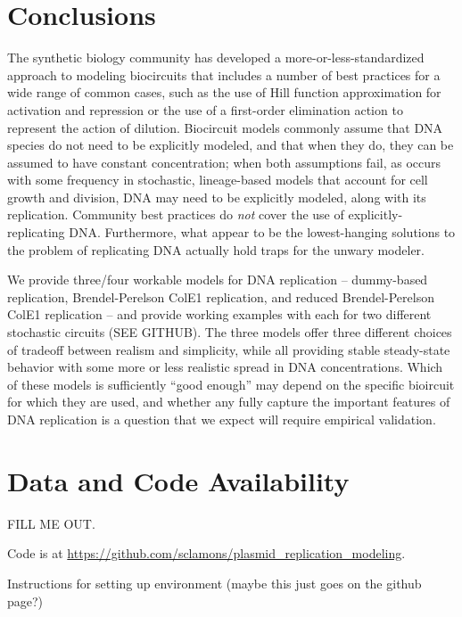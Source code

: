 \documentclass[preprint,12pt]{elsarticle}
\begin{document}
\section{Conclusions} \label{S:conclusions}

The synthetic biology community has developed a more-or-less-standardized approach to modeling biocircuits that includes a number of best practices for a wide range of common cases, such as the use of Hill function approximation for activation and repression or the use of a first-order elimination action to represent the action of dilution. Biocircuit models commonly assume that DNA species do not need to be explicitly modeled, and that when they do, they can be assumed to have constant concentration; when both assumptions fail, as occurs with some frequency in stochastic, lineage-based models that account for cell growth and division, DNA may need to be explicitly modeled, along with its replication. Community best practices do \emph{not} cover the use of explicitly-replicating DNA. Furthermore, what appear to be the lowest-hanging solutions to the problem of replicating DNA actually hold traps for the unwary modeler.

We provide three/four workable models for DNA replication -- dummy-based replication, Brendel-Perelson ColE1 replication, and reduced Brendel-Perelson ColE1 replication -- and provide working examples with each for two different stochastic circuits (SEE GITHUB). The three models offer three different choices of tradeoff between realism and simplicity, while all providing stable steady-state behavior with some more or less realistic spread in DNA concentrations. Which of these models is sufficiently ``good enough'' may depend on the specific bioircuit for which they are used, and whether any fully capture the important features of DNA replication is a question that we expect will require empirical validation.

\section{Data and Code Availability}

FILL ME OUT. 

Code is at \url{https://github.com/sclamons/plasmid_replication_modeling}.

Instructions for setting up environment (maybe this just goes on the github page?)



\end{document}
